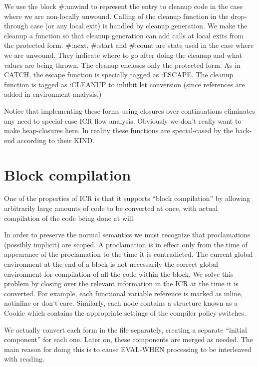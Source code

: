 We use the block \#:unwind to represent the entry to cleanup code in the case
where we are non-locally unwound.  Calling of the cleanup function in the
drop-through case (or any local exit) is handled by cleanup generation.  We
make the cleanup a function so that cleanup generation can add calls at local
exits from the protected form.  \#:next, \#:start and \#:count are state used in
the case where we are unwound.  They indicate where to go after doing the
cleanup and what values are being thrown.  The cleanup encloses only the
protected form.  As in CATCH, the escape function is specially tagged as
:ESCAPE.  The cleanup function is tagged as :CLEANUP to inhibit let conversion
(since references are added in environment analysis.)

Notice that implementing these forms using closures over continuations
eliminates any need to special-case ICR flow analysis.  Obviously we don't
really want to make heap-closures here.  In reality these functions are
special-cased by the back-end according to their KIND.


\section{Block compilation}

One of the properties of ICR is that it supports ``block compilation'' by allowing
arbitrarily large amounts of code to be converted at once, with actual
compilation of the code being done at will.


In order to preserve the normal semantics we must recognize that proclamations
(possibly implicit) are scoped.  A proclamation is in effect only from the time
of appearance of the proclamation to the time it is contradicted.  The current
global environment at the end of a block is not necessarily the correct global
environment for compilation of all the code within the block.  We solve this
problem by closing over the relevant information in the ICR at the time it is
converted.  For example, each functional variable reference is marked as
inline, notinline or don't care.  Similarly, each node contains a structure
known as a Cookie which contains the appropriate settings of the compiler
policy switches.

We actually convert each form in the file separately, creating a separate
``initial component'' for each one.  Later on, these components are merged as
needed.  The main reason for doing this is to cause EVAL-WHEN processing to be
interleaved with reading. 

